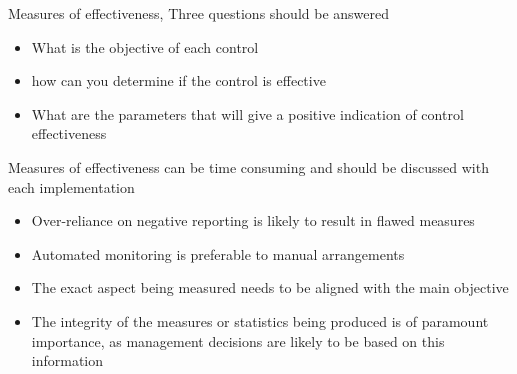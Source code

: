     Measures of effectiveness, Three questions should be answered
\begin{itemize}
   \item What is the objective of each control
   \item how can you determine if the control is effective
   \item What are the parameters that will give a positive indication of control effectiveness
\end{itemize}
    Measures of effectiveness can be time consuming and should be discussed with each implementation
\begin{itemize}
   \item Over-reliance on negative reporting is likely to result in flawed measures
   \item Automated monitoring is preferable to manual arrangements
   \item The exact aspect being measured needs to be aligned with the main objective
   \item The integrity of the measures or statistics being produced is of paramount importance, as management decisions are likely to be based on this information
\end{itemize}

